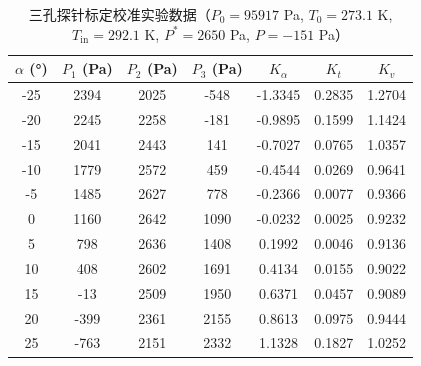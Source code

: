 \begin{table}[H]
  \centering
  \caption[10-0.2Ma 三孔探针标定数据]{三孔探针标定校准实验数据（$P_0=95917$ Pa, $T_0=273.1$ K, $T_{\text{in}}=292.1$ K, $P^*=2650$ Pa, $P=-151$ Pa）}
  \label{tab:exp7_calibration}
  \renewcommand{\arraystretch}{1.2}
  \begin{tabular}{ccccccc}
    \toprule
    $\alpha$ (°) & $P_1$ (Pa) & $P_2$ (Pa) & $P_3$ (Pa) & $K_\alpha$ & $K_t$ & $K_v$ \\
    \midrule
    -25 & 2394 & 2025 & -548 & -1.3345 & 0.2835 & 1.2704 \\
    -20 & 2245 & 2258 & -181 & -0.9895 & 0.1599 & 1.1424 \\
    -15 & 2041 & 2443 & 141 & -0.7027 & 0.0765 & 1.0357 \\
    -10 & 1779 & 2572 & 459 & -0.4544 & 0.0269 & 0.9641 \\
    -5 & 1485 & 2627 & 778 & -0.2366 & 0.0077 & 0.9366 \\
    0 & 1160 & 2642 & 1090 & -0.0232 & 0.0025 & 0.9232 \\
    5 & 798 & 2636 & 1408 & 0.1992 & 0.0046 & 0.9136 \\
    10 & 408 & 2602 & 1691 & 0.4134 & 0.0155 & 0.9022 \\
    15 & -13 & 2509 & 1950 & 0.6371 & 0.0457 & 0.9089 \\
    20 & -399 & 2361 & 2155 & 0.8613 & 0.0975 & 0.9444 \\
    25 & -763 & 2151 & 2332 & 1.1328 & 0.1827 & 1.0252 \\
    \bottomrule
  \end{tabular}
\end{table}